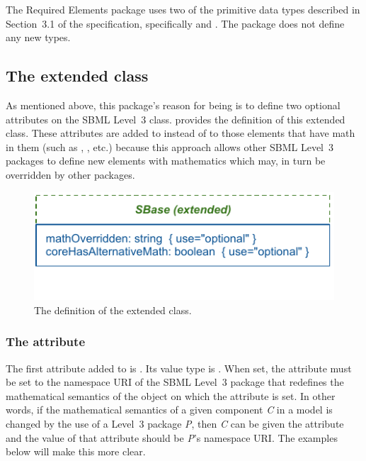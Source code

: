 The Required Elements package uses two of the primitive data types described in Section~3.1 of the \sbmlthreecore specification, specifically  and .  The package does not define any new types.


\subsection{The extended  class}
\label{extended-sbase-class}

As mentioned above, this package's reason for being is to define two optional attributes on the SBML Level~3 \SBase class.   provides the definition of this extended \SBase class.  These attributes are added to \SBase instead of to those elements that have math in them (such as \Parameter, \Species, etc.) because this approach allows other SBML Level~3 packages to define new elements with mathematics which may, in turn be overridden by other packages.

\begin{figure}[bh]
  \includegraphics{figs/extended-sbase-req-uml}
  \vspace*{-3.5em}
  \caption{The definition of the extended \SBase class.}
  \label{extended-sbase-uml}
\end{figure}

\subsubsection{The \fixttspace{} attribute}
\label{attribute-mathoverridden}

The first attribute added to \SBase is .  Its value type is .  When set, the attribute must be set to the namespace URI of the SBML Level~3 package that redefines the mathematical semantics of the object on which the attribute is set.  In other words, if the mathematical semantics of a given component \emph{C} in a model is changed by the use of a Level~3 package \emph{P}, then \emph{C} can be given the attribute  and the value of that attribute should be \emph{P}'s namespace URI.  The examples below will make this more clear.


